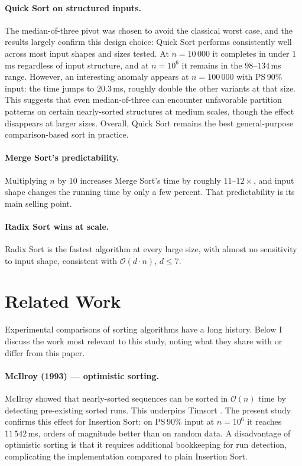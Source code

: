 \documentclass[11pt,a4paper]{article}
\begin{document}
\paragraph{Quick Sort on structured inputs.} The median-of-three pivot was chosen to avoid the classical worst case, and the results largely confirm this design choice: Quick Sort performs consistently well across most input shapes and sizes tested. At $n = 10\,000$ it completes in under $1$\,ms regardless of input structure, and at $n = 10^6$ it remains in the $98$--$134$\,ms range. However, an interesting anomaly appears at $n = 100\,000$ with PS\,90\% input: the time jumps to $20.3$\,ms, roughly double the other variants at that size. This suggests that even median-of-three can encounter unfavorable partition patterns on certain nearly-sorted structures at medium scales, though the effect disappears at larger sizes. Overall, Quick Sort remains the best general-purpose comparison-based sort in practice.

\paragraph{Merge Sort's predictability.} Multiplying $n$ by $10$ increases Merge Sort's time by roughly $11$--$12\times$, and input shape changes the running time by only a few percent. That predictability is its main selling point.

\paragraph{Radix Sort wins at scale.} Radix Sort is the fastest algorithm at every large size, with almost no sensitivity to input shape, consistent with $\mathcal{O}(d \cdot n)$, $d \leq 7$.

\section{Related Work}
\label{sec:related}

Experimental comparisons of sorting algorithms have a long history. Below I discuss the work most relevant to this study, noting what they share with or differ from this paper.

\paragraph{McIlroy (1993) --- optimistic sorting.} McIlroy \cite{mcilroy1993} showed that nearly-sorted sequences can be sorted in $\mathcal{O}(n)$ time by detecting pre-existing sorted runs. This underpins Timsort \cite{auger2019}. The present study confirms this effect for Insertion Sort: on PS\,90\% input at $n = 10^6$ it reaches $11\,542$\,ms, orders of magnitude better than on random data. A disadvantage of optimistic sorting is that it requires additional bookkeeping for run detection, complicating the implementation compared to plain Insertion Sort.
\end{document}
